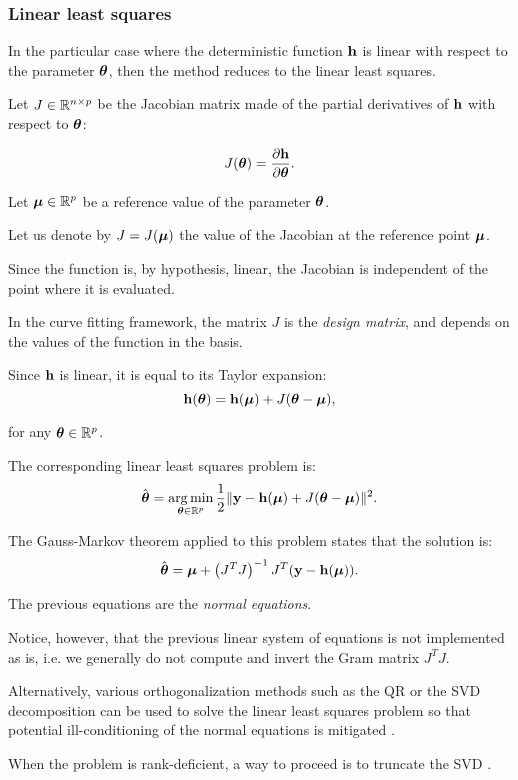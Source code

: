 \documentclass{beamer}
\begin{document}
\begin{frame}
\frametitle{Linear least squares}

In the particular case where the deterministic function ${\bf h}$
is linear with respect to the parameter $\boldsymbol{\theta}$, then the
method reduces to the linear least squares. 

Let $J \in \mathbb{R}^{n \times p}$ be the Jacobian matrix made of the
partial derivatives of ${\bf h}$ with respect to
$\boldsymbol{\theta}$:

$$
J(\boldsymbol{\theta}) = \frac{\partial {\bf h}}{\partial \boldsymbol{\theta}}.
$$

Let $\boldsymbol{\mu} \in \mathbb{R}^p$ be a reference value of the
parameter $\boldsymbol{\theta}$. 

Let us denote by $J=J(\boldsymbol{\mu})$ the value of the Jacobian at the reference point
$\boldsymbol{\mu}$. 

Since the function is, by hypothesis, linear, the
Jacobian is independent of the point where it is evaluated. 

In the curve fitting framework, the matrix $J$ is the \emph{design matrix}, 
and depends on the values of the function in the basis. 
\end{frame}


\begin{frame}
Since ${\bf h}$ is linear, it is equal to its Taylor expansion:
$$
{\bf h}(\boldsymbol{\theta}) = {\bf h}(\boldsymbol{\mu}) + J (\boldsymbol{\theta} - \boldsymbol{\mu}),
$$

for any $\boldsymbol{\theta} \in \mathbb{R}^p$.

The corresponding linear least squares problem is:
$$
\hat{\boldsymbol{\theta}} 
= \operatorname*{arg\,min}_{\boldsymbol{\theta} \in \mathbb{R}^p} \frac{1}{2} \|{\bf y} - {\bf h}(\boldsymbol{\mu}) + J (\boldsymbol{\theta} - \boldsymbol{\mu})\|^2.
$$

The Gauss-Markov theorem applied to this problem states that the
solution is:
$$
\hat{\boldsymbol{\theta}} = \boldsymbol{\mu} + \left(J^T J\right)^{-1} J^T ( {\bf y} - {\bf h}(\boldsymbol{\mu})).
$$

\end{frame}


\begin{frame}
The previous equations are the \emph{normal equations}. 

Notice, however, that the previous linear system of equations 
is not implemented as is, i.e.
we generally do not compute and invert the Gram matrix $J^T J$.

Alternatively, various orthogonalization methods such as the QR or the
SVD decomposition can be used to solve the linear least squares problem
so that potential ill-conditioning of the normal equations is
mitigated \cite{Bjorck1996}.

When the problem is rank-deficient, a way to proceed is to truncate 
the SVD \cite{Hansen00thelcurve}. 
\end{frame}
\end{document}
